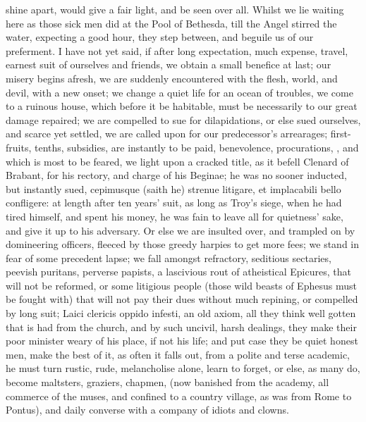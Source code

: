 {shine apart, would give a fair light, and be seen over all. Whilst we
lie waiting here as those sick men did at the Pool of  Bethesda,
till the Angel stirred the water, expecting a good hour, they step
between, and beguile us of our preferment. I have not yet said, if
after long expectation, much expense, travel, earnest suit of ourselves
and friends, we obtain a small benefice at last; our misery begins
afresh, we are suddenly encountered with the flesh, world, and devil,
with a new onset; we change a quiet life for an ocean of troubles, we
come to a ruinous house, which before it be habitable, must be
necessarily to our great damage repaired; we are compelled to sue for
dilapidations, or else sued ourselves, and scarce yet settled, we are
called upon for our predecessor's arrearages; first-fruits, tenths,
subsidies, are instantly to be paid, benevolence, procurations, \etc{},
and which is most to be feared, we light upon a cracked title, as it
befell Clenard of Brabant, for his rectory, and charge of his Beginae;
he was no sooner inducted, but instantly sued, cepimusque (saith
he) strenue litigare, et implacabili bello confligere: at length after
ten years' suit, as long as Troy's siege, when he had tired himself,
and spent his money, he was fain to leave all for quietness' sake, and
give it up to his adversary. Or else we are insulted over, and trampled
on by domineering officers, fleeced by those greedy harpies to get more
fees; we stand in fear of some precedent lapse; we fall amongst
refractory, seditious sectaries, peevish puritans, perverse papists, a
lascivious rout of atheistical Epicures, that will not be reformed, or
some litigious people (those wild beasts of Ephesus must be fought
with) that will not pay their dues without much repining, or compelled
by long suit; Laici clericis oppido infesti, an old axiom, all they
think well gotten that is had from the church, and by such uncivil,
harsh dealings, they make their poor minister weary of his place, if
not his life; and put case they be quiet honest men, make the best of
it, as often it falls out, from a polite and terse academic, he must
turn rustic, rude, melancholise alone, learn to forget, or else, as
many do, become maltsters, graziers, chapmen, \etc{} (now banished from
the academy, all commerce of the muses, and confined to a country
village, as \Ovid was from Rome to Pontus), and daily converse with a
company of idiots and clowns.

}
